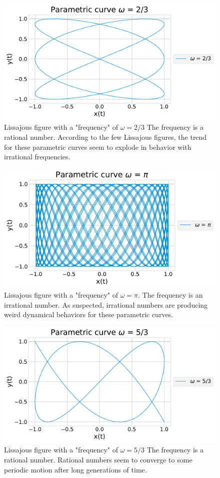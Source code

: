 \documentclass[11pt]{article}
\begin{document}
\begin{figure}[H]
    \centering
    \includegraphics[width = 12 cm]{src/parametricw3.pdf}
    \caption{Lissajous figure with a "frequency" of $\omega = 2/3$ The frequency is a rational number. According to the few Lissajous figures, the trend for these parametric curves seem to explode in behavior with irrational frequencies.  }
    \label{fig:my_label}
\end{figure}
\begin{figure}[H]
    \centering
    \includegraphics[width = 12 cm]{src/parametricw4.pdf}
    \caption{Lissajous figure with a "frequency" of $\omega = \pi$. The frequency is an irrational number. As suspected, irrational numbers are producing weird dynamical behaviors for these parametric curves.}
    \label{fig:my_label}
\end{figure}\begin{figure}[H]
    \centering
    \includegraphics[width = 12 cm]{src/parametricw5.pdf}
    \caption{Lissajous figure with a "frequency" of $\omega = 5/3$ The frequency is a rational number.  Rational numbers seem to converge to some periodic motion after long generations of time. }
    \label{fig:my_label}
\end{figure}
\end{document}
